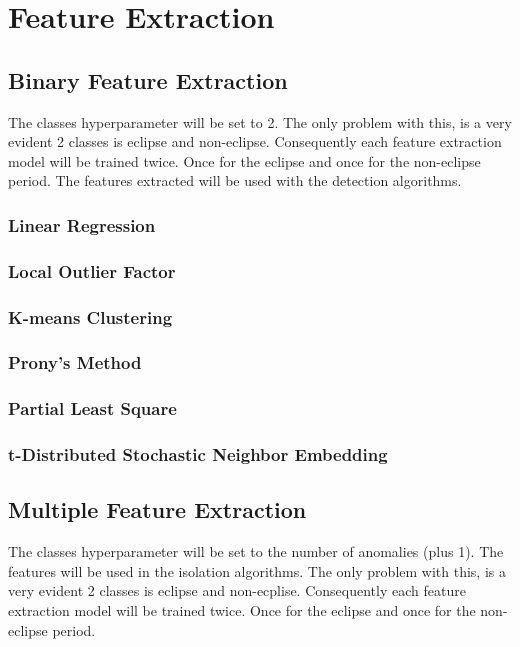 \chapter{Feature Extraction}
\label{chap:Feature Extraction}


\section{Binary Feature Extraction}
The classes hyperparameter will be set to 2. The only problem with this, is a very evident 2 classes is eclipse and non-eclipse. Consequently each feature extraction model will be trained twice. Once for the eclipse and once for the non-eclipse period. The features extracted will be used with the detection algorithms.
\subsection{Linear Regression}

\subsection{Local Outlier Factor}

\subsection{K-means Clustering}

\subsection{Prony's Method}

\subsection{Partial Least Square}

\subsection{t-Distributed Stochastic Neighbor Embedding}

\section{Multiple Feature Extraction}
The classes hyperparameter will be set to the number of anomalies (plus 1). The features will be used in the isolation algorithms. The only problem with this, is a very evident 2 classes is eclipse and non-ecplise. Consequently each feature extraction model will be trained twice. Once for the eclipse and once for the non-eclipse period.
